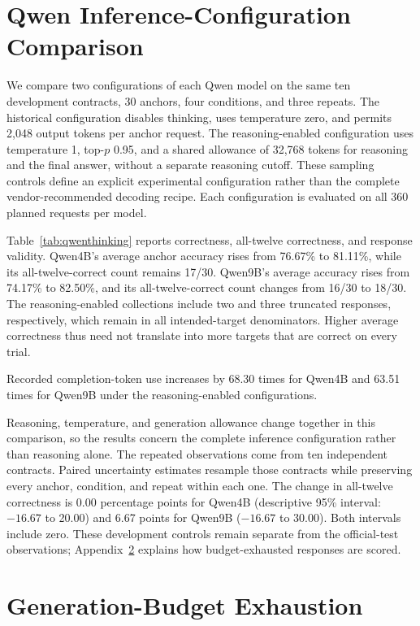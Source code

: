 \documentclass{article}
\begin{document}
\section{Qwen Inference-Configuration Comparison}
\label{app:fairness}
We compare two configurations of each Qwen model on the same ten development contracts, 30 anchors, four conditions, and three repeats. The historical configuration disables thinking, uses temperature zero, and permits 2,048 output tokens per anchor request. The reasoning-enabled configuration uses temperature 1, top-$p$ 0.95, and a shared allowance of 32,768 tokens for reasoning and the final answer, without a separate reasoning cutoff. These sampling controls define an explicit experimental configuration rather than the complete vendor-recommended decoding recipe. Each configuration is evaluated on all 360 planned requests per model.



Table~\ref{tab:qwenthinking} reports correctness, all-twelve correctness, and response validity. Qwen4B's average anchor accuracy rises from 76.67\% to 81.11\%, while its all-twelve-correct count remains 17/30. Qwen9B's average accuracy rises from 74.17\% to 82.50\%, and its all-twelve-correct count changes from 16/30 to 18/30. The reasoning-enabled collections include two and three truncated responses, respectively, which remain in all intended-target denominators. Higher average correctness thus need not translate into more targets that are correct on every trial.

Recorded completion-token use increases by 68.30 times for Qwen4B and 63.51 times for Qwen9B under the reasoning-enabled configurations.

Reasoning, temperature, and generation allowance change together in this comparison, so the results concern the complete inference configuration rather than reasoning alone. The repeated observations come from ten independent contracts. Paired uncertainty estimates resample those contracts while preserving every anchor, condition, and repeat within each one. The change in all-twelve correctness is 0.00 percentage points for Qwen4B (descriptive 95\% interval: $-16.67$ to 20.00) and 6.67 points for Qwen9B ($-16.67$ to 30.00). Both intervals include zero. These development controls remain separate from the official-test observations; Appendix~\ref{app:budget} explains how budget-exhausted responses are scored.

\section{Generation-Budget Exhaustion}
\label{app:budget}
\end{document}
